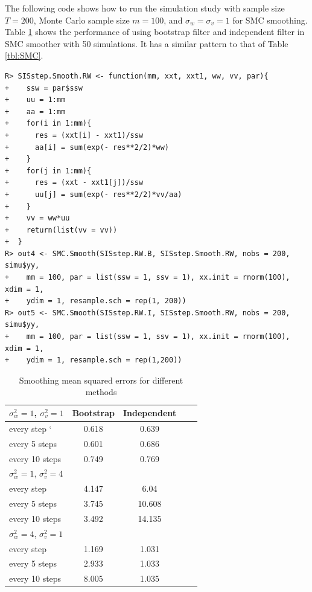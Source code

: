 The following code shows how to run the simulation study with sample size $T=200$, Monte Carlo sample size $m=100$, and $\sigma_w=\sigma_v=1$ for SMC smoothing. Table \ref{tbl:smooth} shows the performance of using bootstrap filter and independent filter in SMC smoother with 50 simulations. It has a similar pattern to that of Table \ref{tbl:SMC}.
\begin{verbatim}
R> SISstep.Smooth.RW <- function(mm, xxt, xxt1, ww, vv, par){
+    ssw = par$ssw
+    uu = 1:mm
+    aa = 1:mm
+    for(i in 1:mm){
+      res = (xxt[i] - xxt1)/ssw
+      aa[i] = sum(exp(- res**2/2)*ww)
+    }
+    for(j in 1:mm){
+      res = (xxt - xxt1[j])/ssw
+      uu[j] = sum(exp(- res**2/2)*vv/aa)
+    }
+    vv = ww*uu
+    return(list(vv = vv))
+  }
R> out4 <- SMC.Smooth(SISstep.RW.B, SISstep.Smooth.RW, nobs = 200, simu$yy,
+    mm = 100, par = list(ssw = 1, ssv = 1), xx.init = rnorm(100), xdim = 1,
+    ydim = 1, resample.sch = rep(1, 200))
R> out5 <- SMC.Smooth(SISstep.RW.I, SISstep.Smooth.RW, nobs = 200, simu$yy,
+    mm = 100, par = list(ssw = 1, ssv = 1), xx.init = rnorm(100), xdim = 1,
+    ydim = 1, resample.sch = rep(1,200))
\end{verbatim}

\begin{table}
\begin{center}
\caption{Smoothing mean squared errors for different methods}
\begin{tabular}{l| c| ccc}\hline
$\sigma_w^2=1$, $\sigma_v^2=1$	&Bootstrap	&Independent\\ \hline
every step		  ` &0.618		  &0.639		\\
every 5 steps	    &0.601			&0.686	\\
every 10 steps	  &0.749			&0.769	\\ \hline
$\sigma_w^2=1$, $\sigma_v^2=4$ &&&&\\ \hline
every step		    &4.147		  &6.04	\\
every 5 steps	    &3.745		  &10.608	\\
every 10 steps	  &3.492		  &14.135	\\ \hline
$\sigma_w^2=4$, $\sigma_v^2=1$ &&&&\\ \hline
every step		    &1.169		  &1.031	\\
every 5 steps	    &2.933		  &1.033	\\
every 10 steps    &8.005			&1.035	\\ \hline
\end{tabular}\label{tbl:smooth}
\end{center}
\end{table}

